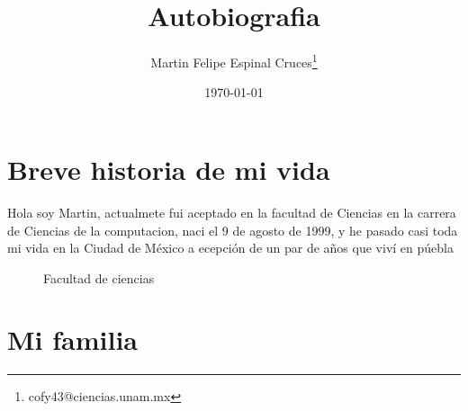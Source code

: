 
\author{Martin Felipe Espinal Cruces\thanks{cofy43@ciencias.unam.mx}}
\title{Autobiografia}
\date{\today}

\renewcommand{\labelitemi}{$\bullet$}




\maketitle
\tableofcontents
{}

\listoffigures
{}

\listoftables
{}

\listoftables
{}









\newpage

\maketitle
\tableofcontents
{}

\chapter*{Breve historia de mi vida}

Hola soy Martin, actualmete  fui aceptado en la facultad de Ciencias en la carrera de Ciencias de la computacion, naci el 9 de agosto de 1999, y he pasado casi toda mi vida en la Ciudad de México a ecepción de un par de años que viví en púebla

\begin{figure}[h]
  \centerimg
  \caption{Facultad de ciencias}
  \label{fig:facultad}
\end{figure}



\newpage

\maketitle
\tableofcontents
{}

\chapter*{Mi familia}

